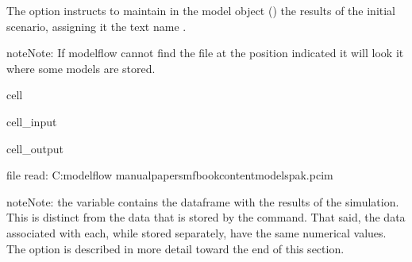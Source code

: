\documentclass[letterpaper,10pt,english]{jupyterBook}
\begin{document}
\sphinxAtStartPar
The  option instructs  to maintain in the model object () the results of the initial scenario, assigning it the text name .

\begin{sphinxadmonition}{note}{Note:}
\sphinxAtStartPar
If modelflow cannot find the file at the position indicated it will look it  where some models are stored.
\end{sphinxadmonition}

\begin{sphinxuseclass}{cell}\begin{sphinxVerbatimInput}

\begin{sphinxuseclass}{cell_input}
\begin{sphinxVerbatim}[commandchars=\\\{\}]
   \PYGZbs{}
                                 
\end{sphinxVerbatim}

\end{sphinxuseclass}\end{sphinxVerbatimInput}
\begin{sphinxVerbatimOutput}

\begin{sphinxuseclass}{cell_output}
\begin{sphinxVerbatim}[commandchars=\\\{\}]
file read:  C:\PYGZbs{}modelflow manual\PYGZbs{}papers\PYGZbs{}mfbook\PYGZbs{}content\PYGZbs{}models\PYGZbs{}pak.pcim
\end{sphinxVerbatim}

\end{sphinxuseclass}\end{sphinxVerbatimOutput}

\end{sphinxuseclass}
\begin{sphinxadmonition}{note}{Note:}
\sphinxAtStartPar
the variable  contains the dataframe with the results of the simulation.  This is distinct from the data that is stored by the  command. That said, the data associated with each, while stored separately, have the same numerical values. The  option is described in more detail toward the end of this section.
\end{sphinxadmonition}
\end{document}
